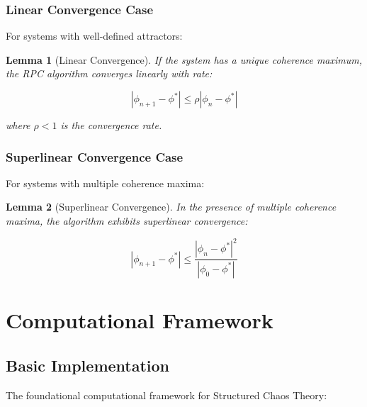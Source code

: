 \documentclass[12pt]{article}
\newtheorem{lemma}{Lemma}
\begin{document}
\subsubsection{Linear Convergence Case}

For systems with well-defined attractors:

\begin{lemma}[Linear Convergence]
If the system has a unique coherence maximum, the RPC algorithm converges linearly with rate:

\begin{equation}
|\phi_{n+1} - \phi^*| \leq \rho |\phi_n - \phi^*|
\end{equation}

where $\rho < 1$ is the convergence rate.
\end{lemma}

\subsubsection{Superlinear Convergence Case}

For systems with multiple coherence maxima:

\begin{lemma}[Superlinear Convergence]
In the presence of multiple coherence maxima, the algorithm exhibits superlinear convergence:

\begin{equation}
|\phi_{n+1} - \phi^*| \leq \frac{|\phi_n - \phi^*|^2}{|\phi_0 - \phi^*|}
\end{equation}
\end{lemma}

\section{Computational Framework}

\subsection{Basic Implementation}

The foundational computational framework for Structured Chaos Theory:
\end{document}
